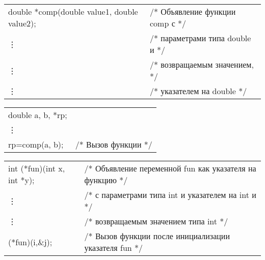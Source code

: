  \begin{pExample}
  \begin{tabular}{ l l }
  double *comp(double value1, double value2);  & \textcolor{exComm}{/* Объявление функции  comp с */}  \\
  \vdots & \textcolor{exComm}{/* параметрами типа double и */}  \\
  \vdots & \textcolor{exComm}{/* возвращаемым значением, */} \\
   \vdots & \textcolor{exComm}{/* указателем на double */} \\
\end{tabular}

  \begin{tabular}{ l l }
  double a, b, *rp; & \textcolor{exComm}{} \\
   \vdots & \textcolor{exComm}{} \\
  rp=comp(a, b); & \textcolor{exComm}{/* Вызов функции */} \\
  \end{tabular}
  \end{pExample}
 
 \begin{pExample}
 \begin{tabular}{ l l }
 int (*fun)(int x, int *y);  & \textcolor{exComm}{/* Объявление переменной fun как указателя на функцию  */}  \\
  \vdots & \textcolor{exComm}{/* с параметрами типа int и указателем на int и */}  \\
  \vdots & \textcolor{exComm}{/* возвращаемым значением типа int */} \\
 (*fun)(i,\&j);  & \textcolor{exComm}{/* Вызов функции после инициализации указателя fun */} \\
 \end{tabular}
 \end{pExample}


\clearpage